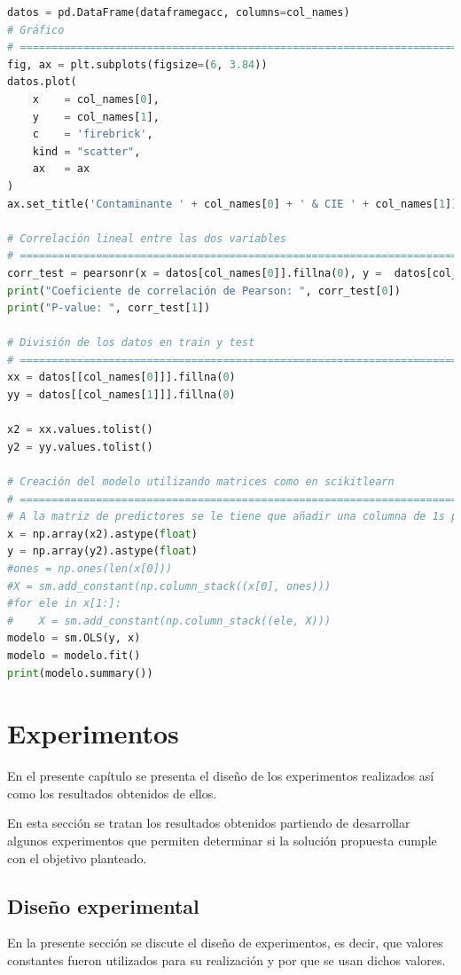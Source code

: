 \begin{lstlisting}[language=Python, caption=Generación de los modelos de regresión lineal, label=lst:c4]
datos = pd.DataFrame(dataframegacc, columns=col_names)
# Gráfico
# ==============================================================================
fig, ax = plt.subplots(figsize=(6, 3.84))
datos.plot(
    x    = col_names[0],
    y    = col_names[1],
    c    = 'firebrick',
    kind = "scatter",
    ax   = ax
)
ax.set_title('Contaminante ' + col_names[0] + ' & CIE ' + col_names[1])

# Correlación lineal entre las dos variables
# ==============================================================================
corr_test = pearsonr(x = datos[col_names[0]].fillna(0), y =  datos[col_names[1]].fillna(0))
print("Coeficiente de correlación de Pearson: ", corr_test[0])
print("P-value: ", corr_test[1])

# División de los datos en train y test
# ==============================================================================
xx = datos[[col_names[0]]].fillna(0)
yy = datos[[col_names[1]]].fillna(0)
        
x2 = xx.values.tolist()
y2 = yy.values.tolist()

# Creación del modelo utilizando matrices como en scikitlearn
# ==============================================================================
# A la matriz de predictores se le tiene que añadir una columna de 1s para el intercept del modelo
x = np.array(x2).astype(float)
y = np.array(y2).astype(float)
#ones = np.ones(len(x[0]))
#X = sm.add_constant(np.column_stack((x[0], ones)))
#for ele in x[1:]:
#    X = sm.add_constant(np.column_stack((ele, X)))
modelo = sm.OLS(y, x)
modelo = modelo.fit()
print(modelo.summary())
\end{lstlisting}

\chapter{Experimentos}
En el presente capítulo se presenta el diseño de los experimentos realizados así como los resultados obtenidos de ellos.

En esta sección se tratan los resultados obtenidos partiendo de desarrollar algunos experimentos que permiten determinar si la solución propuesta cumple con el objetivo planteado.

\section{Diseño experimental}
En la presente sección se discute el diseño de experimentos, es decir, que valores constantes fueron utilizados para su realización y por que se usan dichos valores.

